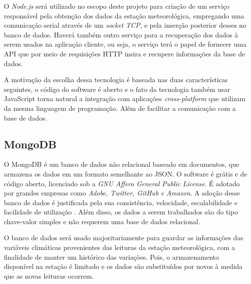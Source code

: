 O \textit{Node.js} será utilizado no escopo deste projeto para criação de um serviço responsável pela obtenção dos dados da estação meteorológica, empregando uma comunicação serial através de um \textit{socket TCP}, e pela inserção posterior desses no banco de dados. Haverá também outro serviço para a recuperação dos dados à serem usados na aplicação cliente, ou seja, o serviço terá o papel de fornecer uma API que por meio de requisições HTTP insira e recupere informações da base de dados.

A motivação da escolha dessa tecnologia é baseada nas duas características seguintes, o código do software é aberto e o fato da tecnologia também usar JavaScript torna natural a integração com aplicações \textit{cross-platform} que utilizam da mesma linguagem de programação. Além de facilitar a comunicação com a base de dados.


\subsection{MongoDB} \label{subsec:MongoDB}

O MongoDB é um banco de dados não relacional baseado em documentos, que armazena os dados em um formato semelhante ao JSON. O software é grátis e de código aberto, licenciado sob a \textit{GNU Affero General Public License}. É adotado por grandes empresas como \textit{Adobe, Twitter, GitHub e Amazon}. A adoção desse banco de dados é justificada pela sua consistência, velocidade, escalabilidade e facilidade de utilização \cite{SITEMONGODB}. Além disso, os dados a serem trabalhados são do tipo chave-valor simples e não requerem uma base de dados relacional.

O banco de dados será usado majoritariamente para guardar as informações das variáveis climáticas provenientes das leituras da estação meteorológica, com a finalidade de manter um histórico das variações. Pois, o armazenamento disponível na estação é limitado e os dados são substituídos por novos à medida que as novas leituras ocorrem.





